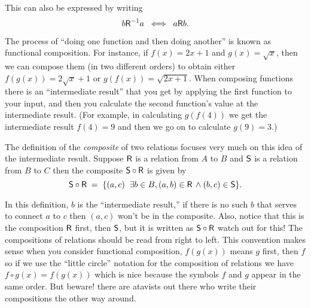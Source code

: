 \documentclass[10pt,]{book}
\theoremstyle{plain}
\theoremstyle{definition}
\theoremstyle{definition}
\numberwithin{equation}{section}
\newcommand{\suchthat}{\;  \;}
\newcommand{\relR}{\mbox{\textsf R}}
\newcommand{\relS}{\mbox{\textsf S}}
\begin{document}
    This can also be expressed by writing
    \begin{equation*}
      b\relR^{-1}a \; \iff \; a\relR b.
    \end{equation*}
\par

    The process of ``doing one function and then doing another'' is known
    as functional composition. For instance,
    if \(f(x) = 2x+1\) and \(g(x) = \sqrt{x}\), then we can compose them (in two
    different orders) to obtain either \(f(g(x)) = 2\sqrt{x}+1\) or
    \(g(f(x)) = \sqrt{2x+1}\). When composing functions there is an ``intermediate
    result'' that you get by applying the first function to your input, and then
    you calculate the second function's value at the intermediate result.
    (For example, in calculating \(g(f(4))\) we get the intermediate result
    \(f(4) = 9\) and then we go on to calculate \(g(9) = 3\).)
\par

    The definition of the \emph{composite}
    of two relations focuses very much on this idea
    of the intermediate result. Suppose \(\relR\) is a relation from
    \(A\) to \(B\) and \(\relS\) is a relation from \(B\) to \(C\) then the composite
    \(\relS \circ \relR\) is given by
    \begin{equation*}
      \relS \circ \relR \; = \; \{ (a,c) \suchthat \exists b \in B, (a,b) \in \relR \, \land (b,c) \in \relS \}.
    \end{equation*}
\par

    In this definition, \(b\) is the ``intermediate result,'' if there is no such
    \(b\) that serves to connect \(a\) to \(c\) then \((a,c)\) won't be in the composite.
    Also, notice that this is the composition \(\relR\) first, then \(\relS\), but
    it is written as \(\relS \circ \relR\) \textemdash{} watch out for this! The
    compositions of relations should be read from right to left. This convention
    makes sense when you consider functional composition, \(f(g(x))\) means \(g\)
    first, then \(f\) so if we use the ``little circle'' notation for the
    composition of relations we have \(f \circ g (x) = f(g(x))\) which is nice
    because the symbols \(f\) and \(g\) appear in the same order. But beware! there
    are atavists out there who write their compositions the other way around.
\par
\end{document}
